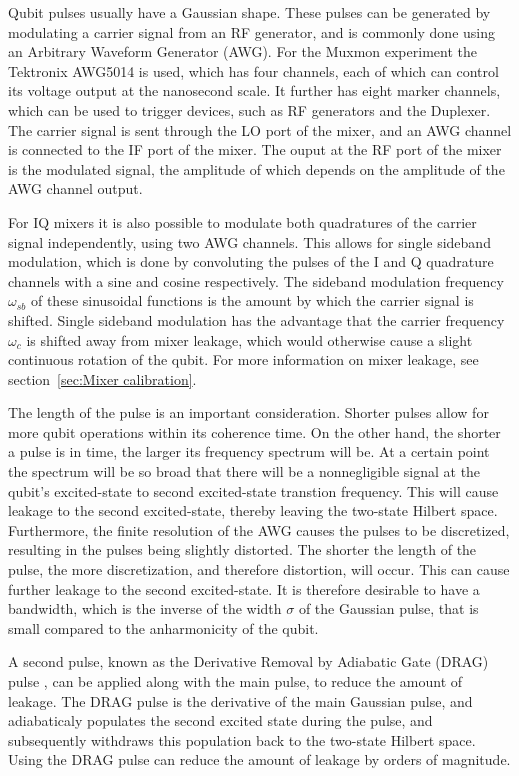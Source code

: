         Qubit pulses usually have a Gaussian shape. These pulses can be generated by modulating a carrier signal from an RF generator, and is commonly done using an Arbitrary Waveform Generator (AWG). For the Muxmon experiment the Tektronix AWG5014 is used, which has four channels, each of which can control its voltage output at the nanosecond scale. It further has eight marker channels, which can be used to trigger devices, such as RF generators and the Duplexer. The carrier signal is sent through the LO port of the mixer, and an AWG channel is connected to the IF port of the mixer. The ouput at the RF port of the mixer is the modulated signal, the amplitude of which depends on the amplitude of the AWG channel output.

        For IQ mixers it is also possible to modulate both quadratures of the carrier signal independently, using two AWG channels. This allows for single sideband modulation, which is done by convoluting the pulses of the I and Q quadrature channels with a sine and cosine respectively. The sideband modulation frequency $\omega_{sb}$ of these sinusoidal functions is the amount by which the carrier signal is shifted. Single sideband modulation has the advantage that the carrier frequency $\omega_c$ is shifted away from mixer leakage, which would otherwise cause a slight continuous rotation of the qubit. For more information on mixer leakage, see section~\ref{sec:Mixer calibration}.

        The length of the pulse is an important consideration. Shorter pulses allow for more qubit operations within its coherence time. On the other hand, the shorter a pulse is in time, the larger its frequency spectrum will be. At a certain point the spectrum will be so broad that there will be a nonnegligible signal at the qubit's excited-state to second excited-state transtion frequency. This will cause leakage to the second excited-state, thereby leaving the two-state Hilbert space.
        Furthermore, the finite resolution of the AWG causes the pulses to be discretized, resulting in the pulses being slightly distorted. The shorter the length of the pulse, the more discretization, and therefore distortion, will occur. This can cause further leakage to the second excited-state. It is therefore desirable to have a bandwidth, which is the inverse of the width $\sigma$ of the Gaussian pulse, that is small compared to the anharmonicity of the qubit.

        A second pulse, known as the Derivative Removal by Adiabatic Gate (DRAG) pulse \cite{motzoi2009simple}, can be applied along with the main pulse, to reduce the amount of leakage. The DRAG pulse is the derivative of the main Gaussian pulse, and adiabaticaly populates the second excited state during the pulse, and subsequently withdraws this population back to the two-state Hilbert space. Using the DRAG pulse can reduce the amount of leakage by orders of magnitude.

